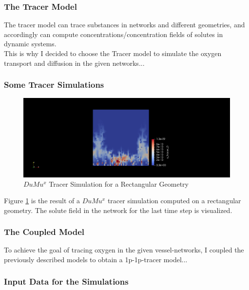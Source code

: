\subsubsection*{The Tracer Model}

The tracer model can trace substances in networks and different geometries, and accordingly can compute concentrations/concentration fields of solutes in dynamic systems.
\\This is why I decided to choose the Tracer model to simulate the oxygen transport and diffusion in the given networks...

\subsubsection*{\footnotesize Some Tracer Simulations}

\begin{figure}[h]
\centering
\includegraphics[width=162mm]{tracer_1}
\caption{\footnotesize $DuMu^x$ Tracer Simulation for a Rectangular Geometry}
\label{fig:tracer_1}
\end{figure}
Figure \ref{fig:tracer_1}  is the result of a $DuMu^x$ tracer simulation computed on a rectangular geometry. The solute field in the network for the last time step is visualized.\\

\subsubsection*{The Coupled Model}

To achieve the goal of tracing oxygen in the given vessel-networks, I coupled the previously described models to obtain a 1p-1p-tracer model...

\subsubsection{Input Data for the Simulations}

